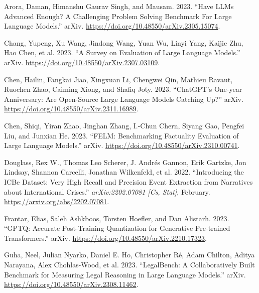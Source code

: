 \documentclass[
]{article}
\newlength{\cslhangindent}
\newenvironment{CSLReferences}[2] %
 {\begin{list}{}{%
  \setlength{\itemindent}{0pt}
  \setlength{\leftmargin}{0pt}
  \setlength{\parsep}{0pt}
  \ifodd #1
   \setlength{\leftmargin}{\cslhangindent}
   \setlength{\itemindent}{-1\cslhangindent}
  \fi
  \setlength{\itemsep}{#2\baselineskip}}}
 {\end{list}}
\begin{document}
\label{refs}
\begin{CSLReferences}{1}{0}
Arora, Daman, Himanshu Gaurav Singh, and Mausam. 2023. {``Have {LLMs
Advanced Enough}? {A Challenging Problem Solving Benchmark For Large
Language Models}.''} {arXiv}.
\url{https://doi.org/10.48550/arXiv.2305.15074}.

Chang, Yupeng, Xu Wang, Jindong Wang, Yuan Wu, Linyi Yang, Kaijie Zhu,
Hao Chen, et al. 2023. {``A {Survey} on {Evaluation} of {Large Language
Models}.''} {arXiv}. \url{https://doi.org/10.48550/arXiv.2307.03109}.

Chen, Hailin, Fangkai Jiao, Xingxuan Li, Chengwei Qin, Mathieu Ravaut,
Ruochen Zhao, Caiming Xiong, and Shafiq Joty. 2023. {``{ChatGPT}'s
{One-year Anniversary}: {Are Open-Source Large Language Models Catching}
Up?''} {arXiv}. \url{https://doi.org/10.48550/arXiv.2311.16989}.

Chen, Shiqi, Yiran Zhao, Jinghan Zhang, I.-Chun Chern, Siyang Gao,
Pengfei Liu, and Junxian He. 2023. {``{FELM}: {Benchmarking Factuality
Evaluation} of {Large Language Models}.''} {arXiv}.
\url{https://doi.org/10.48550/arXiv.2310.00741}.

Douglass, Rex W., Thomas Leo Scherer, J. Andrés Gannon, Erik Gartzke,
Jon Lindsay, Shannon Carcelli, Jonathan Wilkenfeld, et al. 2022.
{``Introducing the {ICBe Dataset}: {Very High Recall} and {Precision
Event Extraction} from {Narratives} about {International Crises}.''}
\emph{arXiv:2202.07081 {[}Cs, Stat{]}}, February.
\url{https://arxiv.org/abs/2202.07081}.

Frantar, Elias, Saleh Ashkboos, Torsten Hoefler, and Dan Alistarh. 2023.
{``{GPTQ}: {Accurate Post-Training Quantization} for {Generative
Pre-trained Transformers}.''} {arXiv}.
\url{https://doi.org/10.48550/arXiv.2210.17323}.

Guha, Neel, Julian Nyarko, Daniel E. Ho, Christopher Ré, Adam Chilton,
Aditya Narayana, Alex Chohlas-Wood, et al. 2023. {``{LegalBench}: {A
Collaboratively Built Benchmark} for {Measuring Legal Reasoning} in
{Large Language Models}.''} {arXiv}.
\url{https://doi.org/10.48550/arXiv.2308.11462}.


\end{CSLReferences}
\end{document}
